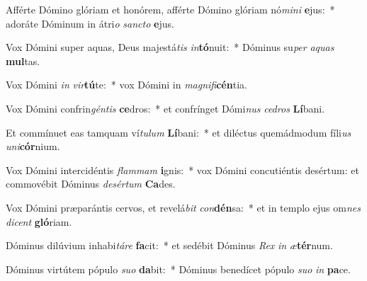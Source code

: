 \item Afférte Dómino glóriam et honórem, afférte Dómino glóriam nó\textit{mi}\textit{ni} \textbf{e}jus:~* adoráte Dóminum in átri\textit{o} \textit{sanc}\textit{to} \textbf{e}jus.
\item Vox Dómini super aquas, Deus majestá\textit{tis} \textit{in}\textbf{tó}nuit:~* Dóminus su\textit{per} \textit{a}\textit{quas} \textbf{mul}tas.
\item Vox Dómini \textit{in} \textit{vir}\textbf{tú}te:~* vox Dómini in \textit{ma}\textit{gni}\textit{fi}\textbf{cén}tia.
\item Vox Dómini confrin\textit{gén}\textit{tis} \textbf{ce}dros:~* et confrínget Dómi\textit{nus} \textit{ce}\textit{dros} \textbf{Lí}bani.
\item Et commínuet eas tamquam ví\textit{tu}\textit{lum} \textbf{Lí}bani:~* et diléctus quemádmodum fíli\textit{us} \textit{u}\textit{ni}\textbf{cór}nium.
\item Vox Dómini intercidéntis \textit{flam}\textit{mam} \textbf{i}gnis:~* vox Dómini concutiéntis desértum: et commovébit Dóminus \textit{de}\textit{sér}\textit{tum} \textbf{Ca}des.
\item Vox Dómini præparántis cervos, et revelá\textit{bit} \textit{con}\textbf{dén}sa:~* et in templo ejus om\textit{nes} \textit{di}\textit{cent} \textbf{gló}riam.
\item Dóminus dilúvium inhabi\textit{tá}\textit{re} \textbf{fa}cit:~* et sedébit Dóminus \textit{Rex} \textit{in} \textit{æ}\textbf{tér}num.
\item Dóminus virtútem pópulo \textit{su}\textit{o} \textbf{da}bit:~* Dóminus benedícet pópulo \textit{su}\textit{o} \textit{in} \textbf{pa}ce.
